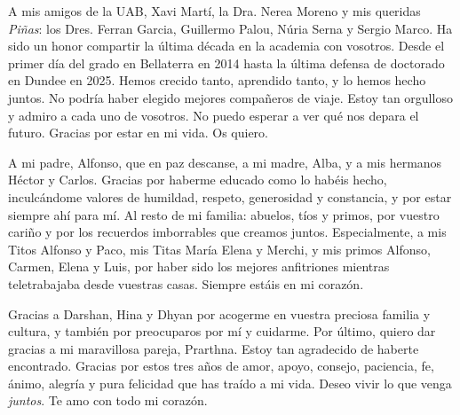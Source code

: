 A mis amigos de la UAB, Xavi Martí, la Dra. Nerea Moreno y mis queridas \textit{Piñas}: los Dres. Ferran Garcia, Guillermo Palou, Núria Serna y Sergio Marco. Ha sido un honor compartir la última década en la academia con vosotros. Desde el primer día del grado en Bellaterra en 2014 hasta la última defensa de doctorado en Dundee en 2025. Hemos crecido tanto, aprendido tanto, y lo hemos hecho juntos. No podría haber elegido mejores compañeros de viaje. Estoy tan orgulloso y admiro a cada uno de vosotros. No puedo esperar a ver qué nos depara el futuro. Gracias por estar en mi vida. Os quiero.

A mi padre, Alfonso, que en paz descanse, a mi madre, Alba, y a mis hermanos Héctor y Carlos. Gracias por haberme educado como lo habéis hecho, inculcándome valores de humildad, respeto, generosidad y constancia, y por estar siempre ahí para mí. Al resto de mi familia: abuelos, tíos y primos, por vuestro cariño y por los recuerdos imborrables que creamos juntos. Especialmente, a mis Titos Alfonso y Paco, mis Titas María Elena y Merchi, y mis primos Alfonso, Carmen, Elena y Luis, por haber sido los mejores anfitriones mientras teletrabajaba desde vuestras casas. Siempre estáis en mi corazón.

Gracias a Darshan, Hina y Dhyan por acogerme en vuestra preciosa familia y cultura, y también por preocuparos por mí y cuidarme. Por último, quiero dar gracias a mi maravillosa pareja, Prarthna. Estoy tan agradecido de haberte encontrado. Gracias por estos tres años de amor, apoyo, consejo, paciencia, fe, ánimo, alegría y pura felicidad que has traído a mi vida. Deseo vivir lo que venga \textit{juntos}. Te amo con todo mi corazón.